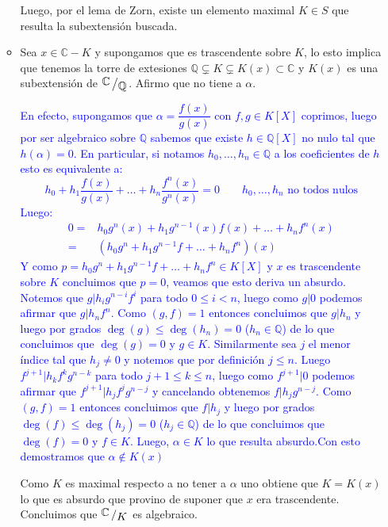 \documentclass[11pt]{article}
\newcommand{\C}{\mathbb{C}}
\newcommand{\Q}{\mathbb{Q}}
\newcommand{\quotient}[2]{{\raisebox{.2em}{$#1$}\left/\raisebox{-.2em}{$#2$}\right.}}
\numberwithin{theorem}{subsection}
\begin{document}
\begin{enumerate}
\begin{itemize}
		Luego, por el lema de Zorn, existe un elemento maximal $K \in S$ que resulta la subextensi\'on buscada.
		
		\item Sea $x \in \C - K$ y supongamos que es trascendente sobre $K$, lo esto implica que tenemos la torre de extesiones $\Q \subsetneq K \subsetneq K(x) \subset \C$ y $K(x)$ es una subextensi\'on de $\quotient{\C}{\Q}$. Afirmo que no tiene a $\alpha$.
		
		\textcolor{blue}{En efecto, supongamos que $\alpha = \dfrac{f(x)}{g(x)}$ con $f,g \in K[X]$ coprimos, luego por ser algebraico sobre $\Q$ sabemos que existe $h \in \Q[X]$ no nulo tal que $h(\alpha) = 0$. En particular, si notamos $h_0, \dots, h_n \in \Q$ a los coeficientes de $h$ esto es equivalente a:
		\begin{equation*}
			h_0 + h_1\dfrac{f(x)}{g(x)} + \dots + h_n\dfrac{f^n(x)}{g^n(x)} = 0 \qquad h_0, \dots, h_n \text{ no todos nulos}
		\end{equation*}
		Luego:
		\begin{equation*}
		\begin{aligned}
			0 = & h_0g^n(x) + h_1g^{n-1}(x)f(x) + \dots + h_nf^n(x) \\
			=& \left(h_0g^n + h_1g^{n-1}f + \dots + h_n f^n\right) (x)
		\end{aligned}
		\end{equation*}
		Y como $p = h_0g^n + h_1g^{n-1}f + \dots + h_nf^n \in K[X]$ y $x$ es trascendente sobre $K$ concluimos que $p = 0$, veamos que esto deriva un absurdo. 
		Notemos que $g \vert h_i g^{n-i} f^{i}$ para todo $0 \leq i < n$, luego como $g \vert 0$ podemos afirmar que $g \vert h_n f^n$. Como $(g,f) = 1$ entonces concluimos que $g \vert h_n$ y luego por grados $\deg (g) \leq \deg(h_n) = 0$ ($h_n \in \Q$) de lo que concluimos que $\deg(g)=0$ y $g \in K$.
		Similarmente sea $j$ el menor \'indice tal que $h_j \neq 0$ y notemos que por definici\'on $j \leq n$. Luego $f^{j+1} \vert h_{k} f^{k}g^{n-k}$ para todo $j+1 \leq k \leq n$, luego como $f^{j+1} \vert 0$ podemos afirmar que $f^{j+1} \vert h_j f^j g^{n-j}$ y cancelando obtenemos $f \vert h_j g^{n-j}$. Como $(g,f) = 1$ entonces concluimos que $f \vert h_j$ y luego por grados $\deg (f) \leq \deg(h_j) = 0$ ($h_j \in \Q$) de lo que concluimos que $\deg(f)=0$ y $f \in K$.
		Luego, $\alpha \in K$ lo que resulta absurdo.Con esto demostramos que $\alpha \not \in K(x)$
	}


		Como $K$ es maximal respecto a no tener a $\alpha$ uno obtiene que $K = K(x)$ lo que es absurdo que provino de suponer que $x$ era trascendente. Concluimos que $\quotient{\C}{K}$ es algebraico.
	

\end{itemize}
\end{enumerate}
\end{document}
